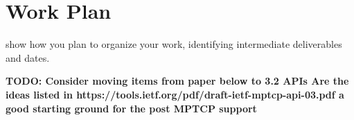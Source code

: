 \documentclass{mprop}
\begin{document}

\pagebreak
\section{Work Plan}

show how you plan to organize your work, identifying intermediate deliverables and dates.

\textbf{
TODO: Consider moving items from paper below to 3.2 APIs
\linebreak
Are the ideas listed in  https://tools.ietf.org/pdf/draft-ietf-mptcp-api-03.pdf a good starting 
ground for the post MPTCP support
}

\pagebreak


\end{document}
